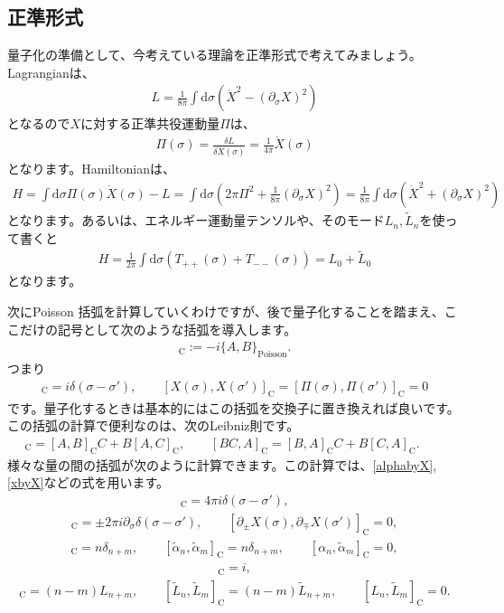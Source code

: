\documentclass[report,paper=a4, fontsize=12pt, line_length=16cm, number_of_lines=33,dvipdfmx]{jlreq}
\numberwithin{equation}{chapter}
\numberwithin{equation}{section}
\newcommand{\del}{\partial}
\newcommand{\alphat}{\tilde{\alpha}}
\newcommand{\Lt}{\widetilde{L}}
\newcommand{\cbk}[1]{[#1]_{\mathrm{C}}}
\newcommand{\di}{\mathrm{d}}
\begin{document}
\subsection{正準形式}
量子化の準備として、今考えている理論を正準形式で考えてみましょう。
Lagrangianは、
\begin{align}
L=\frac{1}{8\pi}\int \di \sigma \left(\dot{X}^2-(\del_{\sigma}X)^2\right)
\end{align}
となるので$X$に対する正準共役運動量$\Pi$は、
\begin{align}
\Pi(\sigma)=\frac{\delta L}{\delta \dot{X}(\sigma)}=\frac{1}{4\pi} \dot{X}(\sigma)
\end{align}
となります。Hamiltonianは、
\begin{align}
H=\int \di \sigma \Pi(\sigma) \dot {X} (\sigma)-L
=\int \di \sigma (2\pi \Pi^2+\frac{1}{8\pi} (\del_{\sigma}X)^2)
=\frac{1}{8\pi}\int \di \sigma (\dot{X}^2+(\del_{\sigma}X)^2)
\end{align}
となります。あるいは、エネルギー運動量テンソルや、そのモード$L_n,\Lt_n$を使って書くと
\begin{align}
H=\frac{1}{2\pi}\int \di \sigma (T_{++}(\sigma)+T_{--}(\sigma))=L_0+\Lt_0\label{CFT-Hamiltonial}
\end{align}
となります。

次にPoisson 括弧を計算していくわけですが、後で量子化することを踏まえ、ここだけの記号として次のような括弧を導入します。
\begin{align}
\cbk{A,B}:=-i\{A,B\}_{\mathrm{Poisson}}.
\end{align}
つまり
\begin{align}
\cbk{X(\sigma),\Pi(\sigma')}=i\delta(\sigma-\sigma'),\qquad
\cbk{X(\sigma),X(\sigma')}=
\cbk{\Pi(\sigma),\Pi(\sigma')}=0
\end{align}
です。量子化するときは基本的にはこの括弧を交換子に置き換えれば良いです。
この括弧の計算で便利なのは、次のLeibniz則です。
\begin{align}
\cbk{A,BC}=\cbk{A,B}C+B\cbk{A,C},\qquad
\cbk{BC,A}=\cbk{B,A}C+B\cbk{C,A}.\qquad
\end{align}
様々な量の間の括弧が次のように計算できます。この計算では、\eqref{alphabyX},\eqref{xbyX}などの式を用います。
\begin{align}
\cbk{X(\sigma),\dot{X}(\sigma')}=
4\pi i \delta(\sigma-\sigma'),
\end{align}
\begin{align}
\cbk{\del_{\pm}X(\sigma),\del_{\pm}X(\sigma')}
=\pm 2\pi i \del_{\sigma}\delta(\sigma-\sigma'),\qquad
\cbk{\del_{\pm}X(\sigma),\del_{\mp}X(\sigma')}=0,
\end{align}
\begin{align}
\cbk{\alpha_{n},\alpha_{m}}=n\delta_{n+m},\qquad
\cbk{\alphat_{n},\alphat_{m}}=n\delta_{n+m},\qquad
\cbk{\alpha_{n},\alphat_{m}}=0,
\end{align}
\begin{align}
  \cbk{x,p}=i,
\end{align}
\begin{align}
\cbk{L_n,L_m}=(n-m)L_{n+m},\qquad
\cbk{\Lt_n,\Lt_m}=(n-m)\Lt_{n+m},\qquad
\cbk{L_n,\Lt_m}=0.
\end{align}
\end{document}
